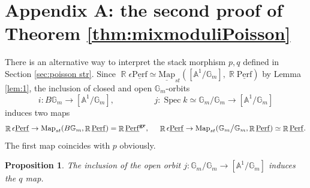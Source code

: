 \documentclass[reqno]{amsart}
\DeclareMathOperator\R{\mathbb R}
\newtheorem{prop}[theorem]{Proposition}
\theoremstyle{definition}
\theoremstyle{remark}
\newcommand{\G}{{\mathbb G}}
\newcommand{\A}{{\mathbb A}}
\newcommand{\ul}{\underline}
\newcommand{\Spec}{\operatorname{Spec}}
\newcommand{\eps}{\epsilon}
\newcommand{\uperf}{\ul{\mathrm{Perf}}}
\newcommand{\gr}{\mathbf{gr}}
\newcommand{\Map}{{\mathrm{Map}}}
\numberwithin{equation}{section}
\begin{document}
\section*{Appendix A: the second proof of Theorem \ref{thm:mixmoduliPoisson}}
There is an alternative way to interpret the stack morphism $p,q$ defined in Section \ref{sec:poisson str}. Since 
$\R\eps\uperf\simeq \ul\Map_{st}([\A^1\big/ \G_m], \R\uperf)$ by Lemma \ref{lem:1}, the inclusion of closed and open $\G_m$-orbits
\[
i: B\G_m\to [\A^1\big/ \G_m], \hspace{2cm} j:\Spec k\simeq \G_m\big/\G_m\to [\A^1\big/ \G_m]
\] induces two maps 
\[
\R\eps\uperf\to \Map_{st}(B\G_m,\R\uperf)=\R\uperf^\gr,\hspace{.5cm} \R\eps\uperf\to \Map_{st}(\G_m\big/\G_m,\R\uperf)\simeq \R\uperf.
\]
The first map coincides with $p$ obviously.  
\begin{prop}\label{q=genericfiber}
The inclusion of the open orbit $j: \G_m\big/ \G_m\to [\A^1\big/ \G_m]$ induces the $q$ map.
\end{prop}
\end{document}
